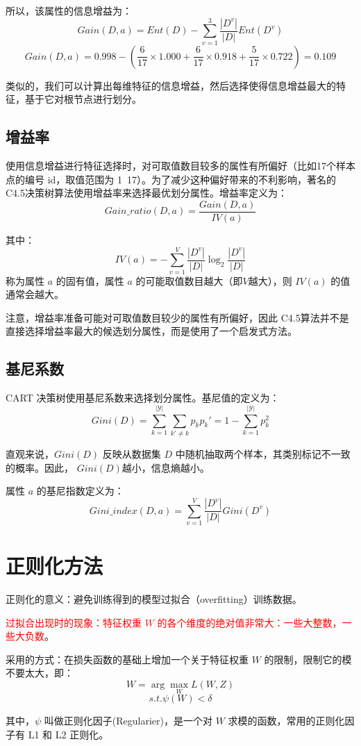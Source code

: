 \documentclass[12pt]{article}
\begin{document}
所以，该属性的信息增益为：
$$
Gain(D,a) = Ent(D) - \sum_{v=1}^3\frac{|D^v|}{|D|}Ent(D^v)
$$
$$
Gain(D,a) = 0.998 - (\frac{6}{17}\times1.000 + \frac{6}{17}\times0.918+\frac{5}{17}\times0.722)
= 0.109
$$

类似的，我们可以计算出每维特征的信息增益，然后选择使得信息增益最大的特征，基于它对根节点进行划分。

\subsection{增益率}
使用信息增益进行特征选择时，对可取值数目较多的属性有所偏好（比如17个样本点的编号 id，取值范围为 1~17）。为了减少这种偏好带来的不利影响，著名的 C4.5决策树算法使用增益率来选择最优划分属性。增益率定义为：
$$
Gain\_ratio(D,a) = \frac{Gain(D,a)}{IV(a)}
$$

其中：
$$
IV(a) = -\sum_{v=1}^V\frac{|D^v|}{|D|}\log_2\frac{|D^v|}{|D|}
$$
称为属性 $a$ 的固有值，属性 $a$ 的可能取值数目越大（即$V$越大），则 $IV(a)$ 的值通常会越大。

注意，增益率准备可能对可取值数目较少的属性有所偏好，因此 C4.5算法并不是直接选择增益率最大的候选划分属性，而是使用了一个启发式方法。

\subsection{基尼系数}
CART 决策树使用基尼系数来选择划分属性。基尼值的定义为：
$$
Gini(D) = \sum_{k=1}^{|\mathcal{Y}|}\sum_{k'\neq k}p_kp_k' = 1 - \sum_{k=1}^{|\mathcal{Y}|}p_k^2
$$

直观来说，$Gini(D)$ 反映从数据集 $D$ 中随机抽取两个样本，其类别标记不一致的概率。因此， $Gini(D)$越小，信息熵越小。

属性 $a$ 的基尼指数定义为：
$$
Gini\_index(D,a) = \sum_{v=1}^{V}\frac{|D^v|}{|D|}Gini(D^v)
$$

\section{正则化方法}
正则化的意义：避免训练得到的模型过拟合（overfitting）训练数据。

\textcolor{red}{过拟合出现时的现象：特征权重 
$W$ 的各个维度的绝对值非常大：一些大整数，一些大负数}。

采用的方式：在损失函数的基础上增加一个关于特征权重 $W$ 的限制，限制它的模不要太大，即：
$$
W = \arg\max_WL(W,Z)
$$
$$
s.t. \psi(W) < \delta
$$

其中，$\psi$ 叫做正则化因子(Regularier)，是一个对 $W$ 求模的函数，常用的正则化因子有 L1 和 L2 正则化。
\end{document}
